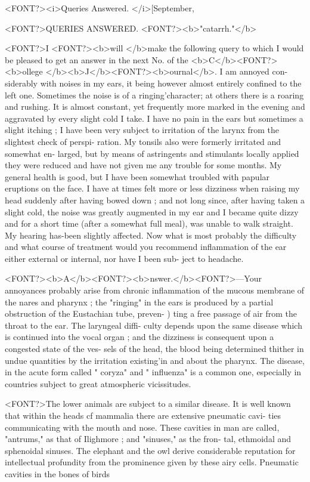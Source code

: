 <FONT?><i>Queries Answered. </i>[September,

<FONT?>QUERIES ANSWERED.
<FONT?><b>"catarrh."</b>

<FONT?>I <FONT?><b>will </b>make the following query to which I would be pleased to get
an answer in the next No. of the <b>C</b><FONT?><b>ollege </b><b>J</b><FONT?><b>ournal</b>. I am annoyed con-
siderably with noises in my ears, it being however almost entirely confined
to the left one. Sometimes the noise is of a ringing'character; at others
there is a roaring and rushing. It is almost constant, yet frequently
more marked in the evening and aggravated by every slight cold I take.
I have no pain in the ears but sometimes a slight itching ; I have been
very subject to irritation of the larynx from the slightest check of perspi-
ration. My tonsils also were formerly irritated and somewhat en-
larged, but by means of astringents and stimulants locally applied they
were reduced and have not given me any trouble for some months. My
general health is good, but I have been somewhat troubled with papular
eruptions on the face. I have at times felt more or less dizziness when
raising my head suddenly after having bowed down ; and not long since,
after having taken a slight cold, the noise was greatly augmented in my
ear and I became quite dizzy and for a short time (after a somewhat full
meal), was unable to walk straight. My hearing has-been slightly affected.
Now what is most probably the difficulty and what course of treatment
would you recommend %
inflammation of the ear either external or internal, nor have I been sub-
ject to headache.

<FONT?><b>A</b><FONT?><b>nswer.</b><FONT?>---Your annoyances probably arise from chronic inflammation
of the mucous membrane of the nares and pharynx ; the "ringing" in the
ears is produced by a partial obstruction of the Eustachian tube, preven-
) ting a free passage of air from the throat to the ear. The laryngeal diffi-
culty depends upon the same disease which is continued into the vocal
organ ; and the dizziness is consequent upon a congested state of the ves-
sels of the head, the blood being determined thither in undue quantities
by the irritation existing'in and about the pharynx. The disease, in the
acute form called " coryza" and " influenza" is a common one, especially
in countries subject to great atmospheric vicissitudes.

<FONT?>The lower animals are subject to a similar disease. It is well known
that within the heads cf mammalia there are extensive pneumatic cavi-
ties communicating with the mouth and nose. These cavities in man
are called, "antrums," as that of Ilighmore ; and "sinuses," as the fron-
tal, ethmoidal and sphenoidal sinuses. The elephant and the owl derive
considerable reputation for intellectual profundity from the prominence
given by these airy cells.   Pneumatic cavities in the bones of birds\endinput
